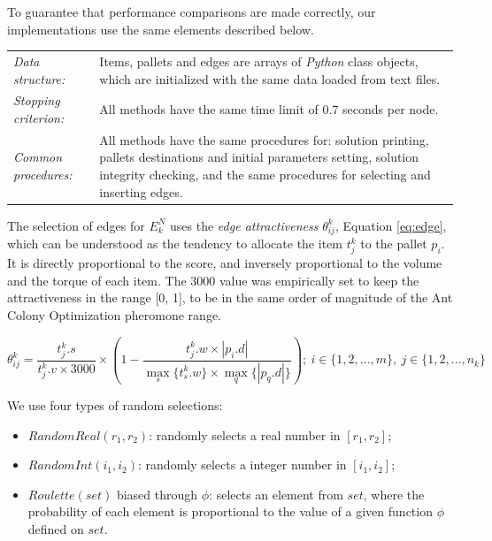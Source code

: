 \documentclass[preprint,authoryear]{elsarticle}
\begin{document}
To guarantee that performance comparisons are made correctly, our implementations use the same elements described below.


\bgroup
\def\arraystretch{1.2}
\begin{table}[H]
	\centering
	\small
	\begin{tabular}{CD}
		
		{\it Data structure:}     & Items, pallets and edges are arrays of \emph{Python} class objects, which are initialized with the same data loaded from text files. \\
		
		{\it Stopping criterion:} & All methods have the same time limit of $0.7$ seconds per node.\\
		
		{\it Common procedures:}  & All methods have the same procedures for: solution printing, pallets destinations and initial parameters setting, solution integrity checking, and the same procedures for selecting and inserting edges.\\

	\end{tabular}
	\normalsize
\end{table}
\egroup

The selection of edges for $E^N_k$\/ uses the {\it edge attractiveness}\/ $\theta^k_{ij}$, Equation \ref{eq:edge}, which can be understood as the tendency to allocate the item $t^k_j$\/ to the pallet $p_i$. It is directly proportional to the score, and inversely proportional to the volume and the torque of each item. The 3000 value was empirically set to keep the attractiveness in the range [0, 1], to be in the same order of magnitude of the Ant Colony Optimization pheromone range.

\begin{equation} \label{eq:edge}
	\theta^k_{ij}= \frac{t^k_j.s}{t^k_j.v \times 3000}\times(1-\frac{t^k_j.w\times|p_i.d|}{\max_s\{t^k_s.w\}\times\max_q\{|p_q.d|\}});\ i \in \{1,2,\ldots,m\},\ j \in \{1,2,\ldots,n_k\}
\end{equation} 


We use four types of random selections:
\begin{itemize}
	\item $RandomReal(r_1,r_2)$: randomly selects a real number in $[r_1,r_2]$;
	\item $RandomInt(i_1,i_2)$: randomly selects a integer number in $[i_1,i_2]$;
	\item $Roulette(set)$ biased through $\phi$: selects an element from $set$, where the probability of each element is proportional to the value of a given function $\phi$\/ defined on $set$.
\end{itemize}
\end{document}
